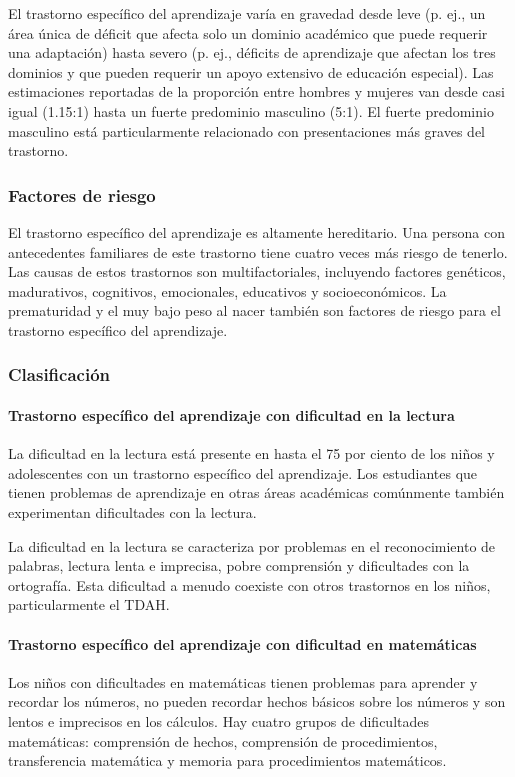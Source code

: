 \documentclass[11pt,letterpaper]{report}
\begin{document}
El trastorno específico del aprendizaje varía en gravedad desde leve (p. ej.,
un área única de déficit que afecta solo un dominio académico que puede
requerir una adaptación) hasta severo (p. ej., déficits de aprendizaje que
afectan los tres dominios y que pueden requerir un apoyo extensivo de
educación especial). Las estimaciones reportadas de la proporción entre
hombres y mujeres van desde casi igual (1.15:1) hasta un fuerte predominio
masculino (5:1). El fuerte predominio masculino está particularmente
relacionado con presentaciones más graves del trastorno. \cite{Frierson2025}

\subsubsection{Factores de riesgo}
El trastorno específico del aprendizaje es altamente hereditario. Una persona
con antecedentes familiares de este trastorno tiene cuatro veces más riesgo de
tenerlo. Las causas de estos trastornos son multifactoriales, incluyendo
factores genéticos, madurativos, cognitivos, emocionales, educativos y
socioeconómicos. La prematuridad y el muy bajo peso al nacer también son
factores de riesgo para el trastorno específico del aprendizaje.
\cite{Frierson2025, Boland2021-by}

\subsubsection{Clasificación}
\paragraph{Trastorno específico del aprendizaje con dificultad en la lectura}
La dificultad en la lectura está presente en hasta el 75 por ciento de los
niños y adolescentes con un trastorno específico del aprendizaje. Los
estudiantes que tienen problemas de aprendizaje en otras áreas académicas
comúnmente también experimentan dificultades con la lectura.
\cite{Boland2021-by}

La dificultad en la lectura se caracteriza por problemas en el reconocimiento
de palabras, lectura lenta e imprecisa, pobre comprensión y dificultades con
la ortografía. Esta dificultad a menudo coexiste con otros trastornos en los
niños, particularmente el TDAH. \cite{Boland2021-by}

\paragraph{Trastorno específico del aprendizaje con dificultad en matemáticas}
Los niños con dificultades en matemáticas tienen problemas para aprender y
recordar los números, no pueden recordar hechos básicos sobre los números y son
lentos e imprecisos en los cálculos. Hay cuatro grupos de dificultades
matemáticas: comprensión de hechos, comprensión de procedimientos,
transferencia matemática y memoria para procedimientos matemáticos.
\end{document}
